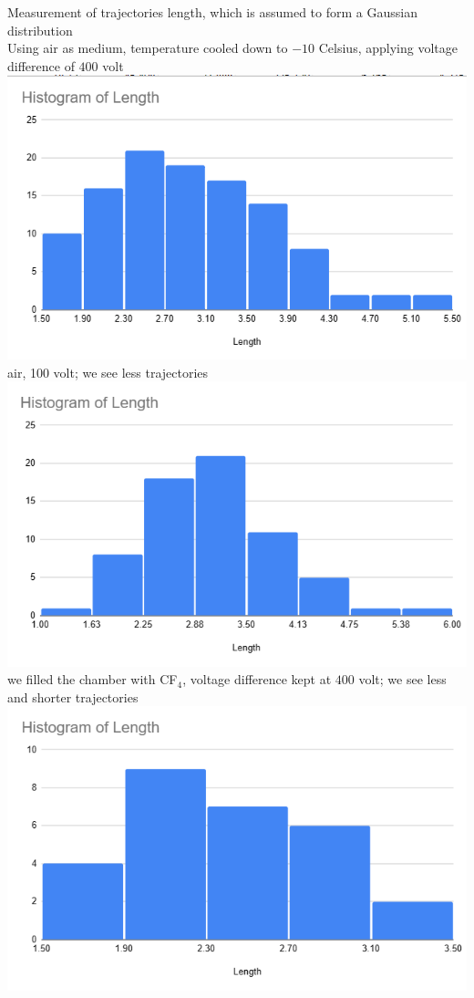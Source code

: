 \documentclass[a4paper]{tufte-handout}
\begin{document}

Measurement of trajectories length, which is assumed to form a Gaussian distribution
\\
Using air as medium, temperature cooled down to $-10$ Celsius, applying voltage difference of $400$ volt
\\
\includegraphics[width = 1 \textwidth]{figures/day2_air400.png}
\\
air, 100 volt; we see less trajectories
\\
\includegraphics[width = 1 \textwidth]{figures/day2_air100.png}
\\
we filled the chamber with CF$_4$, voltage difference kept at $400$ volt; we see less and shorter trajectories
\\
\includegraphics[width = 1 \textwidth]{figures/day2_cf4400.png}
\\
\hrulefill
\end{document}
